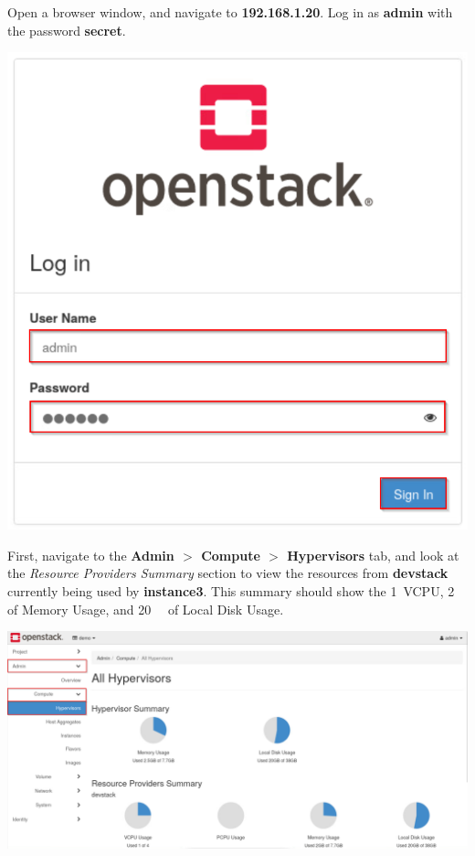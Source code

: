 \documentclass[letterpaper, 12pt]{article}
\begin{document}
\begin{enumerate}
    \begin{labstep}
        Open a browser window, and navigate to \textbf{192.168.1.20}.
        Log in as \textbf{admin} with the password \textbf{secret}.

        \begin{center}
            \includegraphics[scale=0.5]{images/part7/step1.png}
        \end{center}
    \end{labstep}

    \begin{labstep}
        First, navigate to the \textbf{Admin $>$ Compute $>$ Hypervisors} tab, and look at the \textit{Resource Providers Summary} section to view the resources from \textbf{devstack} currently being used by \textbf{instance3}.
        This summary should show the 1~VCPU, \qty{2}{\giga\byte} of Memory Usage, and \qty{20}{\giga\byte} of Local Disk Usage.

        \begin{center}
            \includegraphics[width=\linewidth]{images/part7/step2.png}
        \end{center}
    \end{labstep}


\end{enumerate}
\end{document}
